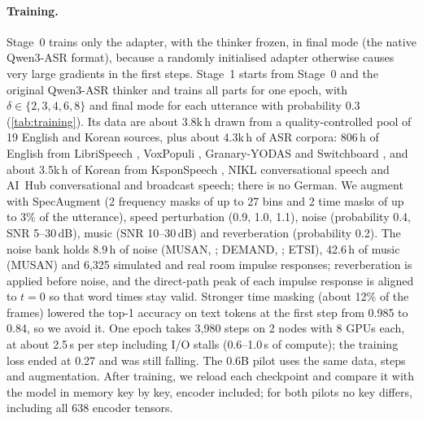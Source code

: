 \paragraph{Training.}
Stage~0 trains only the adapter, with the thinker frozen, in final mode (the native Qwen3-ASR format), because a randomly initialised adapter otherwise causes very large gradients in the first steps. Stage~1 starts from Stage~0 and the original Qwen3-ASR thinker and trains all parts for one epoch, with $\delta\in\{2,3,4,6,8\}$ and final mode for each utterance with probability 0.3 (\cref{tab:training}). Its data are about 3.8k\,h drawn from a quality-controlled pool of 19 English and Korean sources, plus about 4.3k\,h of ASR corpora: 806\,h of English from LibriSpeech \citep{panayotov2015librispeech}, VoxPopuli \citep{wang2021voxpopuli}, Granary-YODAS \citep{koluguri2025granary} and Switchboard \citep{godfrey1992switchboard}, and about 3.5k\,h of Korean from KsponSpeech \citep{bang2020ksponspeech}, NIKL conversational speech and AI~Hub conversational and broadcast speech; there is no German. We augment with SpecAugment \citep{park2019specaugment} (2 frequency masks of up to 27 bins and 2 time masks of up to 3\% of the utterance), speed perturbation (0.9, 1.0, 1.1), noise (probability 0.4, SNR 5--30\,dB), music (SNR 10--30\,dB) and reverberation (probability 0.2). The noise bank holds 8.9\,h of noise (MUSAN, \citealp{snyder2015musan}; DEMAND, \citealp{thiemann2013demand}; ETSI), 42.6\,h of music (MUSAN) and 6,325 simulated and real room impulse responses; reverberation is applied before noise, and the direct-path peak of each impulse response is aligned to $t=0$ so that word times stay valid. Stronger time masking (about 12\% of the frames) lowered the top-1 accuracy on text tokens at the first step from 0.985 to 0.84, so we avoid it. One epoch takes 3,980 steps on 2 nodes with 8 GPUs each, at about 2.5\,s per step including I/O stalls (0.6--1.0\,s of compute); the training loss ended at 0.27 and was still falling. The 0.6B pilot uses the same data, steps and augmentation. After training, we reload each checkpoint and compare it with the model in memory key by key, encoder included; for both pilots no key differs, including all 638 encoder tensors.



